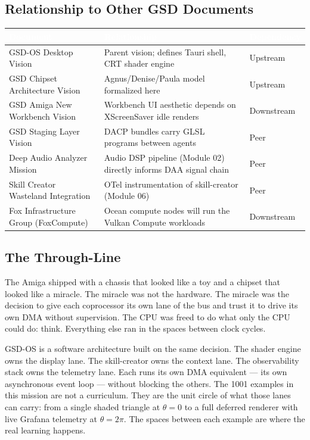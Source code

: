 \documentclass[11pt,letterpaper]{article}
\newcommand{\tableheader}[1]{\textbf{\sffamily\textcolor{white}{#1}}}
\begin{document}
\subsection{Relationship to Other GSD Documents}

\begin{center}
\begin{tabularx}{\textwidth}{L{4.5cm}XC{2.5cm}}
\toprule
{}
\tableheader{Document} & \tableheader{Relationship} & \tableheader{Dependency} \\
\midrule
GSD-OS Desktop Vision & Parent vision; defines Tauri shell, CRT shader engine & Upstream \\
GSD Chipset Architecture Vision & Agnus/Denise/Paula model formalized here & Upstream \\
GSD Amiga New Workbench Vision & Workbench UI aesthetic depends on XScreenSaver idle renders & Downstream \\
GSD Staging Layer Vision & DACP bundles carry GLSL programs between agents & Peer \\
Deep Audio Analyzer Mission & Audio DSP pipeline (Module 02) directly informs DAA signal chain & Peer \\
Skill Creator Wasteland Integration & OTel instrumentation of skill-creator (Module 06) & Peer \\
Fox Infrastructure Group (FoxCompute) & Ocean compute nodes will run the Vulkan Compute workloads & Downstream \\
\bottomrule
\end{tabularx}
\end{center}

\subsection{The Through-Line}

The Amiga shipped with a chassis that looked like a toy and a chipset that looked like a miracle. The miracle was not the hardware. The miracle was the decision to give each coprocessor its own lane of the bus and trust it to drive its own DMA without supervision. The CPU was freed to do what only the CPU could do: think. Everything else ran in the spaces between clock cycles.

GSD-OS is a software architecture built on the same decision. The shader engine owns the display lane. The skill-creator owns the context lane. The observability stack owns the telemetry lane. Each runs its own DMA equivalent — its own asynchronous event loop — without blocking the others. The 1001 examples in this mission are not a curriculum. They are the unit circle of what those lanes can carry: from a single shaded triangle at $\theta = 0$ to a full deferred renderer with live Grafana telemetry at $\theta = 2\pi$. The spaces between each example are where the real learning happens.
\end{document}

